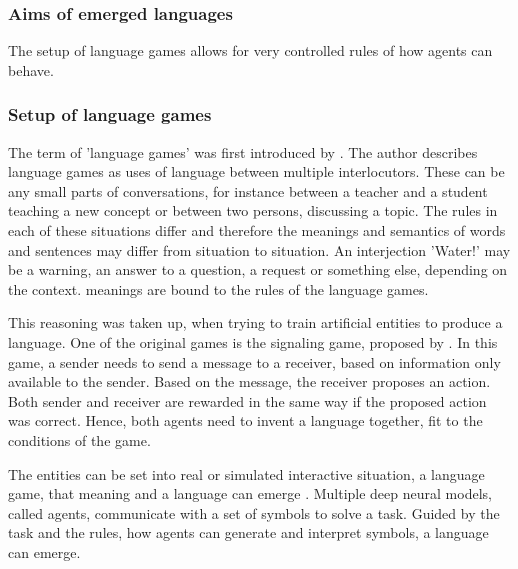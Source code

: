\subsubsection{Aims of emerged languages}
\label{sec:aims_languages}
The setup of language games allows for very controlled rules of how agents can behave.


\subsubsection{Setup of language games}
\label{sec:setup-lg}
The term of 'language games' was first introduced by \citet{Wittgenstein1953}.
The author describes language games as uses of language between multiple interlocutors.
These can be any small parts of conversations, for instance between a teacher and a student teaching a new concept or between two persons, discussing a topic.
The rules in each of these situations differ and therefore the meanings and semantics of words and sentences may differ from situation to situation.
An interjection 'Water!' may be a warning, an answer to a question, a request or something else, depending on the context.
meanings are bound to the rules of the language games.

This reasoning was taken up, when trying to train artificial entities to produce a language.
One of the original games is the signaling game, proposed by \citet{Lewis1969}.
In this game, a sender needs to send a message to a receiver, based on information only available to the sender.
Based on the message, the receiver proposes an action.
Both sender and receiver are rewarded in the same way if the proposed action was correct.
Hence, both agents need to invent a language together, fit to the conditions of the game.

The entities can be set into real or simulated interactive situation, a language game, that meaning and a language can emerge \citep{Kirby2002}.
Multiple deep neural models, called agents, communicate with a set of symbols to solve a task.
Guided by the task and the rules, how agents can generate and interpret symbols, a language can emerge.

